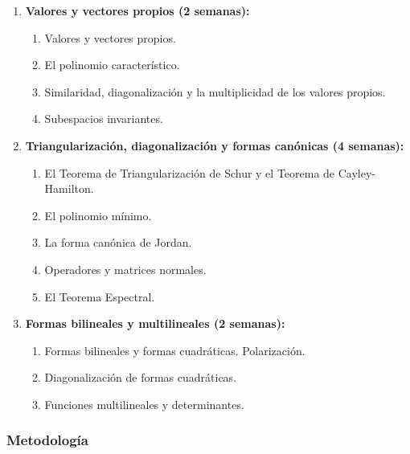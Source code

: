 \begin{refsection}
\begin{enumerate}
\item \textbf{Valores y vectores propios (2 semanas):} 
\begin{enumerate}
    \item Valores y vectores propios.
    \item El polinomio característico.
    \item Similaridad, diagonalización y la multiplicidad de los valores propios.
    \item Subespacios invariantes.
\end{enumerate}

\item \textbf{Triangularización, diagonalización y formas canónicas (4 semanas):} 
\begin{enumerate}
    \item El Teorema de Triangularización de Schur y el Teorema de Cayley-Hamilton.
    \item El polinomio mínimo.
    \item La forma canónica de Jordan.
        \item Operadores y matrices normales.
    \item El Teorema Espectral.
\end{enumerate}

\item \textbf{Formas bilineales y multilineales (2 semanas):} 
\begin{enumerate}
    \item Formas bilineales y formas cuadráticas. Polarización.
    \item Diagonalización de formas cuadráticas.
    \item Funciones multilineales y determinantes.
\end{enumerate}

\end{enumerate}

\subsubsection*{Metodología}


\end{refsection}
